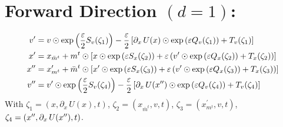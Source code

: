 \documentclass[../main.tex]{subfiles}
\begin{document}
\section{Forward Direction \texorpdfstring{$(d = 1)$}{(d = 1)}:}%
\label{sec:lf_forward}
\begin{align}
  \vp &= v \odot \exp{\left(\frac{\eps}{2}S_{v}(\zeta_{1})\right)}%
        - \frac{\eps}{2}\left[\partial_{x}\,U(x)\odot \exp{\left(\eps
          Q_{v}(\zeta_{1})\right)}%
        + T_{v}(\zeta_{1})\right] \\
  \xp &= x_{\bar{m}^{t}} + m^{t}\odot \left[x \odot \exp{\left(\eps
    S_{x}(\zeta_{2})\right)}%
        + \eps\left(\vp\odot\exp{\left(\eps Q_{x}(\zeta_{2})\right)} 
          + T_{x}(\zeta_{2})\right)\right] \\
  \xpp &= x^{\prime}_{m^{t}} + \bar{m}^{t}\odot \left[\xp \odot \exp{\left(\eps
    S_{x}(\zeta_{3})\right)}%
        + \eps\left(\vp\odot\exp{\left(\eps Q_{x}(\zeta_{3})\right)} +
      T_{x}(\zeta_{3})\right)\right] \\
  \vpp &= \vp \odot \exp{\left(\frac{\eps}{2}S_{v}(\zeta_{4})\right)}%
        - \frac{\eps}{2}\left[\partial_{x}\,U(\xpp)\odot \exp{\left(\eps
          Q_{v}(\zeta_{4})\right)}%
          + T_{v}(\zeta_{4})\right]
\end{align} 
%
With $\zeta_{1} = (x, \partial_{x}\, U(x), t)$, $\zeta_{2} = (x_{\bar{m}^{t}},
v, t)$, $\zeta_{3} = (x^{\prime}_{m^{t}}, v, t)$, $\zeta_{4} = ({x^{\prime\prime}},
\partial_{x}\, U({x^{\prime\prime}}), t)$.
%
\end{document}
